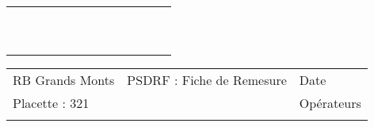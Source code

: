 \documentclass[a4paper, landscape]{article}\usepackage[]{graphicx}\usepackage[]{color}
\begin{document}
{\begin{tabular}{|p{1cm}|p{2cm}|p{1.6cm}|p{1.6cm}|p{1.6cm}|p{1.6cm}|p{1.5cm}|p{1.5cm}|p{1.5cm}|p{1.5cm}|p{1.5cm}|p{7.5cm}|p{5cm}|}
   \rowcolor[gray]{0.95} \hline
 &  &  &  &  &  &  &  &  &  &  &  &  \\ 
   \hline
 &  &  &  &  &  &  &  &  &  &  &  &  \\ 
   \rowcolor[gray]{0.95} \hline
 &  &  &  &  &  &  &  &  &  &  &  &  \\ 
   \hline
 &  &  &  &  &  &  &  &  &  &  &  &  \\ 
   \rowcolor[gray]{0.95} \hline
 &  &  &  &  &  &  &  &  &  &  &  &  \\ 
   \hline
 &  &  &  &  &  &  &  &  &  &  &  &  \\ 
   \rowcolor[gray]{0.95} \hline
 &  &  &  &  &  &  &  &  &  &  &  &  \\ 
   \hline
 &  &  &  &  &  &  &  &  &  &  &  &  \\ 
   \rowcolor[gray]{0.95} \hline
 &  &  &  &  &  &  &  &  &  &  &  &  \\ 
   \hline
 &  &  &  &  &  &  &  &  &  &  &  &  \\ 
   \rowcolor[gray]{0.95} \hline
 &  &  &  &  &  &  &  &  &  &  &  &  \\ 
   \hline
\end{tabular}
}

\begin{tabular}{p{10cm}p{10cm}p{8cm}}
  RB Grands Monts & PSDRF : Fiche de Remesure & Date \\ 
  Placette : 321 &  & Opérateurs \\ 
   &  &  \\ 
  \end{tabular}
\end{document}
